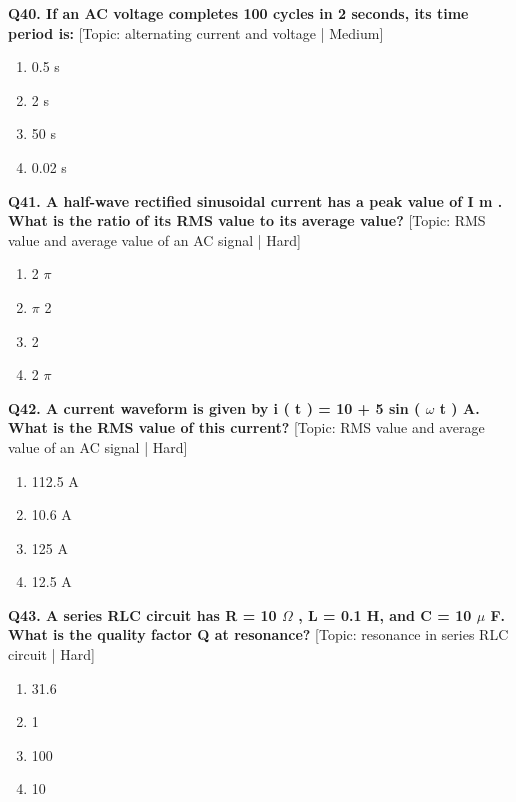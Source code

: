 \noindent\textbf{Q40. If an AC voltage completes 100 cycles in 2 seconds, its time period is:} \hfill [Topic: alternating current and voltage | Medium]
\begin{enumerate}[label=(\alph*),topsep=2pt,itemsep=1pt,partopsep=0pt,parsep=0pt]
    \item {0.5 s}
    \item {2 s}
    \item {50 s}
    \item {0.02 s}
\end{enumerate}
\vspace{2mm}

\noindent\textbf{Q41. A half-wave rectified sinusoidal current has a peak value of I m . What is the ratio of its RMS value to its average value?} \hfill [Topic: RMS value and average value of an AC signal | Hard]
\begin{enumerate}[label=(\alph*),topsep=2pt,itemsep=1pt,partopsep=0pt,parsep=0pt]
    \item {2 $\pi$}
    \item {$\pi$ 2}
    \item {2}
    \item {2 $\pi$}
\end{enumerate}
\vspace{2mm}

\noindent\textbf{Q42. A current waveform is given by i ( t ) = 10 + 5 sin ( $\omega$ t ) A. What is the RMS value of this current?} \hfill [Topic: RMS value and average value of an AC signal | Hard]
\begin{enumerate}[label=(\alph*),topsep=2pt,itemsep=1pt,partopsep=0pt,parsep=0pt]
    \item {112.5 A}
    \item {10.6 A}
    \item {125 A}
    \item {12.5 A}
\end{enumerate}
\vspace{2mm}

\noindent\textbf{Q43. A series RLC circuit has R = 10 $\Omega$ , L = 0.1 H, and C = 10 $\mu$ F. What is the quality factor Q at resonance?} \hfill [Topic: resonance in series RLC circuit | Hard]
\begin{enumerate}[label=(\alph*),topsep=2pt,itemsep=1pt,partopsep=0pt,parsep=0pt]
    \item {31.6}
    \item {1}
    \item {100}
    \item {10}
\end{enumerate}
\vspace{2mm}

